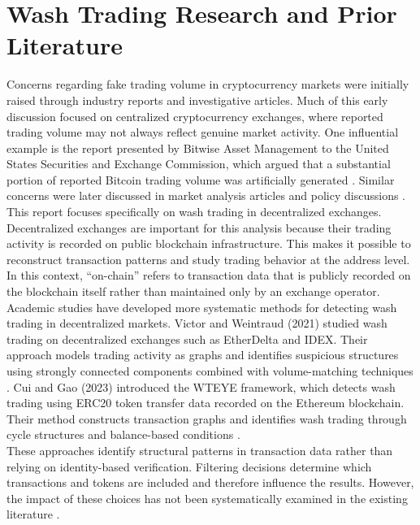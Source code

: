 \documentclass[language=english,thesis=bachelor,nosecondtitle,faculty=cb,onesided,13pt]{hsmw-thesis}
\begin{document}
	\section{Wash Trading Research and Prior Literature}
Concerns regarding fake trading volume in cryptocurrency markets were initially raised through industry reports and investigative articles. Much of this early discussion focused on centralized cryptocurrency exchanges, where reported trading volume may not always reflect genuine market activity. One influential example is the report presented by Bitwise Asset Management to the United States Securities and Exchange Commission, which argued that a substantial portion of reported Bitcoin trading volume was artificially generated \cite{bitwise2019presentation}. Similar concerns were later discussed in market analysis articles and policy discussions \cite{vilner2019new}.\\
This report focuses specifically on wash trading in decentralized exchanges. Decentralized exchanges are important for this analysis because their trading activity is recorded on public blockchain infrastructure. This makes it possible to reconstruct transaction patterns and study trading behavior at the address level. In this context, “on-chain” refers to transaction data that is publicly recorded on the blockchain itself rather than maintained only by an exchange operator.\\
Academic studies have developed more systematic methods for detecting wash trading in decentralized markets. Victor and Weintraud (2021) studied wash trading on decentralized exchanges such as EtherDelta and IDEX. Their approach models trading activity as graphs and identifies suspicious structures using strongly connected components combined with volume-matching techniques \cite{victor2021detecting}.
Cui and Gao (2023) introduced the WTEYE framework, which detects wash trading using ERC20 token transfer data recorded on the Ethereum blockchain. Their method constructs transaction graphs and identifies wash trading through cycle structures and balance-based conditions \cite{cui2023chain}.\\
These approaches identify structural patterns in transaction data rather than relying on identity-based verification. Filtering decisions determine which transactions and tokens are included and therefore influence the results. However, the impact of these choices has not been systematically examined in the existing literature \cite{victor2021detecting, cui2023chain}.
\end{document}
